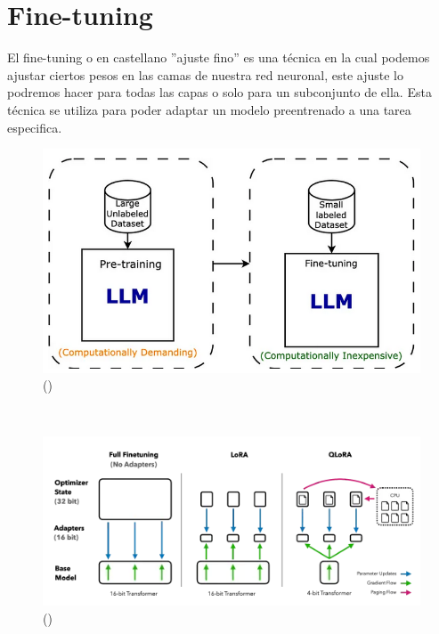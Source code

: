 \section{Fine-tuning}
\label{sec:fine_tuning}

El fine-tuning o en castellano ''ajuste fino'' es una técnica en la cual podemos ajustar 
ciertos pesos en las camas de nuestra red neuronal, este ajuste lo podremos hacer para 
todas las capas o solo para un subconjunto de ella. Esta técnica se utiliza para poder
adaptar un modelo preentrenado a una tarea especifica.

\begin{figure}[H]
    \begin{center}
      \includegraphics[width=15cm]{figuras/Capitulo_09/TrainVSFinetuning.png}
    \end{center}
    \caption[]{(\cite{SupervisedFineTuning})}
    \label{fig:finetuning}
\end{figure}\

\begin{figure}[H]
    \begin{center}
      \includegraphics[width=15cm]{figuras/Capitulo_09/QLoRa.png}
    \end{center}
    \caption[]{(\cite{SupervisedFineTuning})}
    \label{fig:qlora}
\end{figure}\
